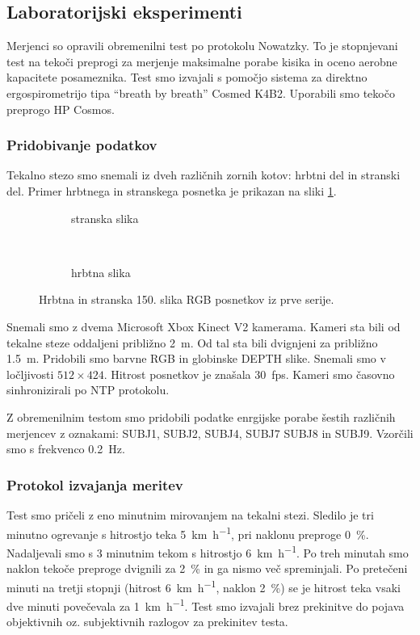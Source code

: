 \subsection{Laboratorijski eksperimenti}
Merjenci so opravili obremenilni test po protokolu Nowatzky. To je stopnjevani test na tekoči preprogi za merjenje maksimalne porabe kisika in oceno aerobne kapacitete posameznika. Test smo izvajali s pomočjo sistema za direktno ergospirometrijo tipa ``breath  by breath'' Cosmed K4B2. Uporabili smo  tekočo  preprogo HP Cosmos.

\subsubsection{Pridobivanje podatkov}
Tekalno stezo smo snemali iz dveh različnih zornih kotov: hrbtni del in stranski del.  Primer hrbtnega in stranskega posnetka je prikazan na sliki \ref{fig:primer-posnetka-stage2}.

\begin{figure}[htb]
	\centering
	\begin{subfigure}{0.45\columnwidth}
		\caption{stranska slika}
	\end{subfigure}
	~
	\begin{subfigure}{0.45\columnwidth}
		\caption{hrbtna slika}
	\end{subfigure}
	\caption{Hrbtna in stranska 150. slika RGB posnetkov iz prve serije.}
	\label{fig:primer-posnetka-stage2}
\end{figure}

Snemali smo z dvema Microsoft Xbox Kinect V2 kamerama. Kameri sta bili od tekalne steze oddaljeni približno \SI{2}{m}. Od tal sta bili dvignjeni za približno \SI{1.5}{m}. Pridobili smo barvne RGB in globinske DEPTH slike. Snemali smo v ločljivosti $512 \times 424$. Hitrost posnetkov je znašala \SI{30}{fps}. Kameri smo časovno sinhronizirali po NTP protokolu.

Z obremenilnim testom smo pridobili podatke enrgijske porabe šestih različnih merjencev z oznakami: SUBJ1, SUBJ2, SUBJ4, SUBJ7 SUBJ8 in SUBJ9. Vzorčili smo s frekvenco \SI{0.2}{\hertz}.

\subsubsection{Protokol izvajanja meritev}
Test smo pričeli z eno minutnim mirovanjem na tekalni stezi. Sledilo je tri minutno ogrevanje s hitrostjo teka \SI{5}{\km\per\hour}, pri naklonu preproge \SI{0}{\%}. Nadaljevali smo s 3 minutnim tekom s hitrostjo \SI{6}{\km\per\hour}. Po treh minutah smo naklon tekoče preproge  dvignili za \SI{2}{\%} in ga nismo več spreminjali. Po pretečeni minuti na  tretji stopnji (hitrost \SI{6}{\km\per\hour}, naklon \SI{2}{\%}) se je hitrost teka vsaki dve  minuti  povečevala za \SI{1}{\km\per\hour}. Test smo izvajali brez prekinitve do pojava objektivnih oz. subjektivnih razlogov za prekinitev testa. 
 

